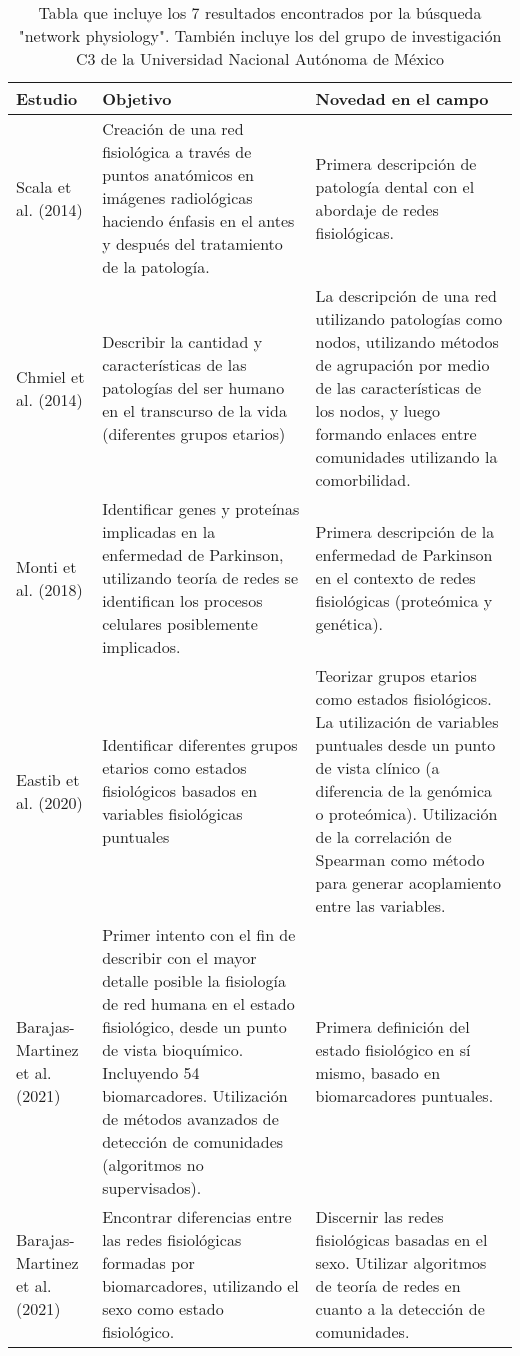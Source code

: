 \documentclass[twoside,twocolumn]{article}
\begin{document}
\begin{center}
  \begin{table}[t]
    \begin{tabular}{|lp{6cm}p{6cm}|}
      \hline
      Estudio & Objetivo & Novedad en el campo \\
      \hline
      Scala et al. (2014) \cite{scala2014complex}&
        Creación de una red fisiológica a través de puntos anatómicos en imágenes radiológicas haciendo énfasis en el antes y después del tratamiento de la patología.
        & Primera descripción de patología dental con el abordaje de redes fisiológicas.
      \\\hline
      Chmiel et al. (2014) \cite{chmiel2014spreading} &
      Describir la cantidad y características de las patologías del ser humano en el transcurso de la vida (diferentes grupos etarios)
      &
      La descripción de una red utilizando patologías como nodos, utilizando métodos de agrupación por medio de las características de los nodos, y luego formando enlaces entre comunidades utilizando la comorbilidad.
      \\\hline
      Monti et al. (2018) \cite{monti2018network} &
      Identificar genes y proteínas implicadas en la enfermedad de Parkinson, utilizando teoría de redes se identifican los procesos celulares posiblemente implicados. & Primera descripción de la enfermedad de Parkinson en el contexto de redes fisiológicas (proteómica y genética).
      \\ \hline
      Eastib et al. (2020) \cite{easton2020metabolic} &
      Identificar diferentes grupos etarios como estados fisiológicos basados en variables fisiológicas puntuales
      &
      Teorizar grupos etarios como estados fisiológicos.
      La utilización de variables puntuales desde un punto de vista clínico (a diferencia de la genómica o proteómica).
      Utilización de la correlación de Spearman como método para generar acoplamiento entre las variables.
      \\\hline
      Barajas-Martinez et al. (2021) \cite{barajas2021physiological}
      &
      Primer intento con el fin de describir con el mayor detalle posible la fisiología de red humana en el estado fisiológico, desde un punto de vista bioquímico. Incluyendo 54 biomarcadores.
      Utilización de métodos avanzados de detección de comunidades (algoritmos no supervisados).
      &
      Primera definición del estado fisiológico en sí mismo, basado en biomarcadores puntuales.
      \\\hline
      Barajas-Martinez et al. (2021) \cite{barajas2021sex}
      &
      Encontrar diferencias entre las redes fisiológicas formadas por biomarcadores, utilizando el sexo como estado fisiológico.
      &
      Discernir las redes fisiológicas basadas en el sexo.
      Utilizar algoritmos de teoría de redes en cuanto a la detección de comunidades.
      \\\hline
    \end{tabular}
    \caption{Tabla que incluye los 7 resultados encontrados por la búsqueda "network physiology". También incluye los del grupo de investigación C3 de la Universidad Nacional Autónoma de México}
    \label{tab:allGroups}
  \end{table}
\end{center}
\end{document}
